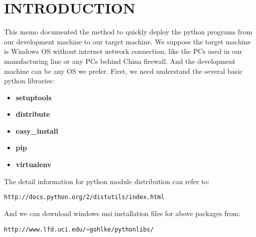 \newcommand{\WorkWeek}{1339} %
\newcommand{\BossName}{Arden Chang} %
\newcommand{\BossInitials}{ARDN} %
\newcommand{\Author}{Qiling Bo} %
\newcommand{\AuthorInitials}{QIBO} %
\newcommand{\MemoNumber}{118} %
\newcommand{\Subject}{PACKAGE AND DEPLOY PYTHON PROJECT TO WINDOWS OS} %
\newcommand{\Category}{trackpad, manufacturing test} %
\newcommand{\Distribution}{PZHO, MZFA, WEIQ, ARDN, RQB, BMOCHINA} %





\maketitle

\section{INTRODUCTION}
This memo documented the method to quickly deploy the python programs from our development machine to our target machine.
We suppose the target machine is Windows OS without internet network connection, 
like the PCs used in our manufacturing line or any PCs behind China firewall.
And the development machine can be any OS we prefer.
First, we need understand the several basic python libraries:
\begin{itemize}
    \item
    \textbf{setuptools} 
    \item
    \textbf{distribute} 
    \item
    \textbf{easy\_install} 
    \item
    \textbf{pip} 
    \item
    \textbf{virtualenv} 
\end{itemize}
The detail information for python module distribution can refer to:
\begin{lstlisting}
http://docs.python.org/2/distutils/index.html 
\end{lstlisting}
And we can download windows msi installation files for above packages from:
\begin{lstlisting}
http://www.lfd.uci.edu/~gohlke/pythonlibs/
\end{lstlisting}

